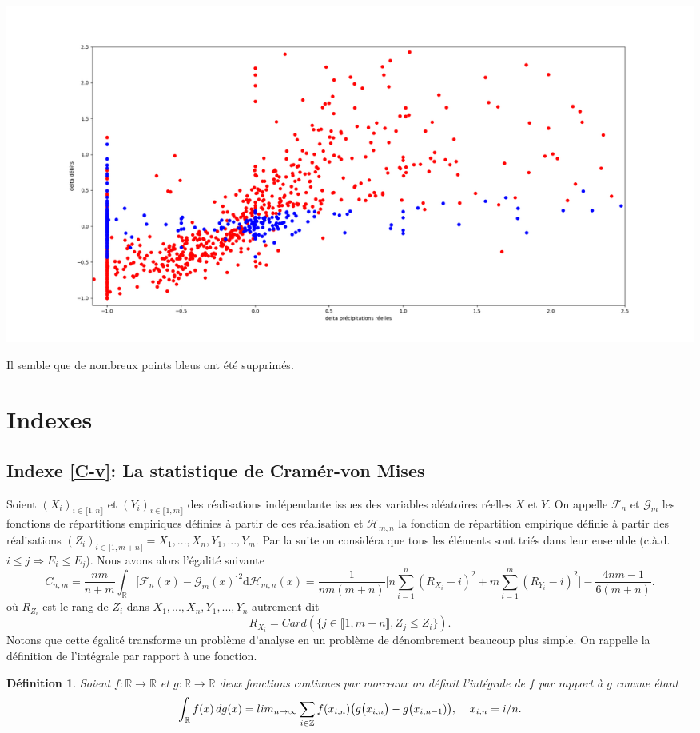 \documentclass[a4paper,11pt]{article}
\newtheorem{definition}{Définition}
\begin{document}
\begin{center}
	\captionsetup{type=figure}
	\includegraphics[scale=0.33]{classification_deb_prr.png}
\end{center}

Il semble que de nombreux points bleus ont été supprimés. 
\newpage

\section{Indexes}

\subsection{Indexe \ref{C-v}: La statistique de Cramér-von Mises}
\label{lemme Cramer-von Mise}
Soient $(X_i)_{i\in \llbracket 1,n \rrbracket}$ et $(Y_i)_{i\in \llbracket 1,m \rrbracket }$ des réalisations indépendante issues des variables aléatoires réelles $X$ et $Y$. On appelle $\mathcal{F}_{n}$ et $\mathcal{G}_{m}$ les fonctions de répartitions empiriques définies à partir de ces réalisation et $\mathcal{H}_{m,n}$ la fonction de répartition empirique définie à partir des réalisations $(Z_i)_{i\in \llbracket 1,m+n \rrbracket }=X_1,...,X_n,Y_1,...,Y_m$. Par la suite on considéra que tous les éléments sont triés dans leur ensemble (c.à.d. $i\leq j \Rightarrow E_i\leq E_j$). Nous avons alors l'égalité suivante
\begin{equation}
	C_{n,m}=\frac{nm}{n+m}\int_{\mathbb{R}}\big[ \mathcal{F}_{n}(x)-\mathcal{G}_{m}(x)\big]^{2} \mathrm{d} \mathcal{H}_{m,n}(x)=\frac{1}{nm(m+n)}\Big[ n\sum_{i=1}^{n}(R_{X_i}-i)^2+ m\sum_{i=1}^{m}(R_{Y_i}-i)^2\Big]-\frac{4nm-1}{6(m+n)}.
\end{equation}
	où $R_{Z_i}$ est le rang de $Z_i$ dans $X_1,...,X_n,Y_1,...,Y_n$ autrement dit 
	\[R_{X_i}=Card(\{j \in \llbracket 1,m+n \rrbracket , Z_j\leq Z_i\}).\] 
Notons que cette égalité transforme un problème d'analyse en un problème de dénombrement beaucoup plus simple. On rappelle la définition de l'intégrale par rapport à une fonction.
\begin{definition}
	Soient $f:\mathbb{R} \to \mathbb{R}$ et $g:\mathbb{R} \to \mathbb{R}$ deux fonctions continues par morceaux on définit l'intégrale de $f$ par rapport à $g$ comme étant
	\[\int_{\mathbb{R}}f(x)\, dg(x)=lim_{n\to\infty}\sum_{i \in \mathbb{Z}}f(x_{i,n})\big( g\big(x_{i,n}\big)-g\big(x_{i,n-1})\big),\hspace{4mm}x_{i,n}=i/n.\]
\end{definition}
\end{document}
